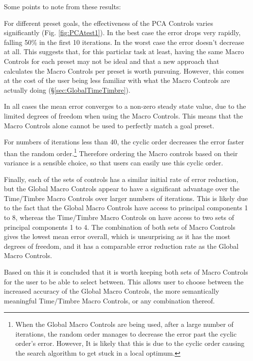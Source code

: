 \documentclass[11pt, oneside]{report}   	%
\begin{document}
Some points to note from these results:

For different preset goals, the effectiveness of the PCA Controls varies significantly (Fig. \ref{fig:PCAtest1}). In the best case the error drops very rapidly, falling 50\% in the first 10 iterations. In the worst case the error doesn't decrease at all. This suggests that, for this particlar task at least, having the same Macro Controls for each preset may not be ideal and that a new approach that calculates the Macro Controls per preset is worth pursuing. However, this comes at the cost of the user being less familiar with what the Macro Controls are actually doing (\S \ref{sec:GlobalTimeTimbre}).

In all cases the mean error converges to a non-zero steady state value,  due to the limited degrees of freedom when using the Macro Controls. This means that the Macro Controls alone cannot be used to perfectly match a goal preset.

For numbers of iterations less than 40, the cyclic order decreases the error faster than the random order.\footnote{
When the Global Macro Controls are being used, after a large number of iterations, the random order manages to decrease the error past the cyclic order's error. However, It is likely that this is due to the cyclic order causing the search algorithm to get stuck in a local optimum.} Therefore ordering the Macro controls based on their variance is a sensible choice, so that users can easily use this cyclic order. 

Finally, each of the sets of controls has a similar initial rate of error reduction, but the Global Macro Controls appear to have a significant advantage over the Time/Timbre Macro Controls over larger numbers of iterations. This is likely due to the fact that the Global Macro Controls have access to principal components 1 to 8, whereas the Time/Timbre Macro Controls on have access to two sets of principal components 1 to 4. The combination of both sets of Macro Controls gives the lowest mean error overall, which is unsurprising as it has the most degrees of freedom, and it has a comparable error reduction rate as the Global Macro Controls.

Based on this it is concluded that it is worth keeping both sets of Macro Controls for the user to be able to select between. This allows user to choose between the increased accuracy of the Global Macro Controls, the more semantically meaningful Time/Timbre Macro Controls, or any combination thereof.
\end{document}
